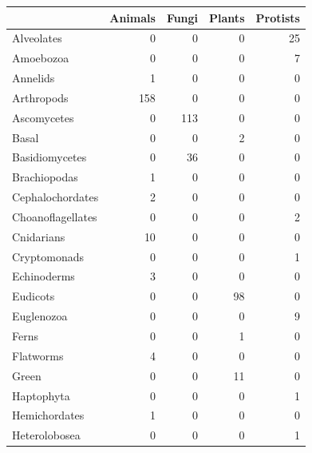 \documentclass[
  letterpaper,
  DIV=11,
  numbers=noendperiod]{scrreprt}
\newenvironment{Shaded}{}{}
\newcommand{\AttributeTok}[1]{\textcolor[rgb]{0.78,0.47,0.87}{#1}}
\newcommand{\FunctionTok}[1]{\textcolor[rgb]{0.38,0.69,0.94}{#1}}
\newcommand{\NormalTok}[1]{\textcolor[rgb]{0.67,0.70,0.75}{#1}}
\newcommand{\SpecialCharTok}[1]{\textcolor[rgb]{0.34,0.71,0.76}{#1}}
\newcommand{\StringTok}[1]{\textcolor[rgb]{0.60,0.76,0.47}{#1}}
\begin{document}
\begin{Shaded}
\end{Shaded}

\begin{tabular}{l|r|r|r|r}
\hline
  & Animals & Fungi & Plants & Protists\\
\hline
Alveolates & 0 & 0 & 0 & 25\\
\hline
Amoebozoa & 0 & 0 & 0 & 7\\
\hline
Annelids & 1 & 0 & 0 & 0\\
\hline
Arthropods & 158 & 0 & 0 & 0\\
\hline
Ascomycetes & 0 & 113 & 0 & 0\\
\hline
Basal & 0 & 0 & 2 & 0\\
\hline
Basidiomycetes & 0 & 36 & 0 & 0\\
\hline
Brachiopodas & 1 & 0 & 0 & 0\\
\hline
Cephalochordates & 2 & 0 & 0 & 0\\
\hline
Choanoflagellates & 0 & 0 & 0 & 2\\
\hline
Cnidarians & 10 & 0 & 0 & 0\\
\hline
Cryptomonads & 0 & 0 & 0 & 1\\
\hline
Echinoderms & 3 & 0 & 0 & 0\\
\hline
Eudicots & 0 & 0 & 98 & 0\\
\hline
Euglenozoa & 0 & 0 & 0 & 9\\
\hline
Ferns & 0 & 0 & 1 & 0\\
\hline
Flatworms & 4 & 0 & 0 & 0\\
\hline
Green & 0 & 0 & 11 & 0\\
\hline
Haptophyta & 0 & 0 & 0 & 1\\
\hline
Hemichordates & 1 & 0 & 0 & 0\\
\hline
Heterolobosea & 0 & 0 & 0 & 1\\

\end{tabular}
\end{document}
